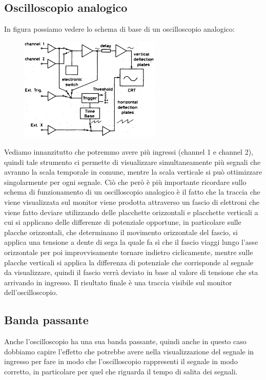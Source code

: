 \subsection{Oscilloscopio analogico}
In figura possiamo vedere lo schema di base di un oscilloscopio analogico:
\begin{figure}[H]
   \centering
   \includegraphics[width=0.6\textwidth]{immagini/schema_oscilloscopio_analogico.png}
\end{figure}
Vediamo innanzitutto che potremmo avere più ingressi (channel 1 e channel 2), quindi tale strumento ci permette di visualizzare simultaneamente più segnali che avranno la scala temporale in comune, mentre la scala verticale si può ottimizzare singolarmente per ogni segnale. Ciò che però è più importante ricordare sullo schema di funzionamento di un oscilloscopio analogico è il fatto che la traccia che viene visualizzata sul monitor viene prodotta attraverso un fascio di elettroni che viene fatto deviare utilizzando delle placchette orizzontali e placchette verticali a cui si applicano delle differenze di potenziale opportune, in particolare sulle placche orizzontali, che determinano il movimento orizzontale del fascio, si applica una tensione a dente di sega la quale fa sì che il fascio viaggi lungo l'asse orizzontale per poi improvvisamente tornare indietro ciclicamente, mentre sulle placche verticali si applica la differenza di potenziale che corrisponde al segnale da visualizzare, quindi il fascio verrà deviato in base al valore di tensione che sta arrivando in ingresso. Il risultato finale è una traccia visibile sul monitor dell'oscilloscopio.

\subsection{Banda passante}
Anche l'oscilloscopio ha una sua banda passante, quindi anche in questo caso dobbiamo capire l'effetto che potrebbe avere nella visualizzazione del segnale in ingresso per fare in modo che l'oscilloscopio rappresenti il segnale in modo corretto, in particolare per quel che riguarda il tempo di salita dei segnali. 

